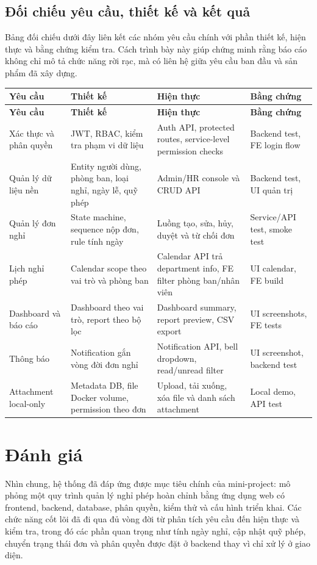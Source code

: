 \subsection{Đối chiếu yêu cầu, thiết kế và kết quả}
Bảng đối chiếu dưới đây liên kết các nhóm yêu cầu chính với phần thiết kế, hiện thực và bằng chứng kiểm tra. Cách trình bày này giúp chứng minh rằng báo cáo không chỉ mô tả chức năng rời rạc, mà có liên hệ giữa yêu cầu ban đầu và sản phẩm đã xây dựng.

\begingroup
\small
\begin{longtable}{p{}p{}p{}p{}}
\toprule
\textbf{Yêu cầu} & \textbf{Thiết kế} & \textbf{Hiện thực} & \textbf{Bằng chứng} \\
\midrule
\endfirsthead
\toprule
\textbf{Yêu cầu} & \textbf{Thiết kế} & \textbf{Hiện thực} & \textbf{Bằng chứng} \\
\midrule
\endhead
Xác thực và phân quyền & JWT, RBAC, kiểm tra phạm vi dữ liệu & Auth API, protected routes, service-level permission checks & Backend test, FE login flow \\
Quản lý dữ liệu nền & Entity người dùng, phòng ban, loại nghỉ, ngày lễ, quỹ phép & Admin/HR console và CRUD API & Backend test, UI quản trị \\
Quản lý đơn nghỉ & State machine, sequence nộp đơn, rule tính ngày & Luồng tạo, sửa, hủy, duyệt và từ chối đơn & Service/API test, smoke test \\
Lịch nghỉ phép & Calendar scope theo vai trò và phòng ban & Calendar API trả department info, FE filter phòng ban/nhân viên & UI calendar, FE build \\
Dashboard và báo cáo & Dashboard theo vai trò, report theo bộ lọc & Dashboard summary, report preview, CSV export & UI screenshots, FE tests \\
Thông báo & Notification gắn vòng đời đơn nghỉ & Notification API, bell dropdown, read/unread filter & UI screenshot, backend test \\
Attachment local-only & Metadata DB, file Docker volume, permission theo đơn & Upload, tải xuống, xóa file và danh sách attachment & Local demo, API test \\
\bottomrule
\end{longtable}
\endgroup

\section{Đánh giá}
Nhìn chung, hệ thống đã đáp ứng được mục tiêu chính của mini-project: mô phỏng một quy trình quản lý nghỉ phép hoàn chỉnh bằng ứng dụng web có frontend, backend, database, phân quyền, kiểm thử và cấu hình triển khai. Các chức năng cốt lõi đã đi qua đủ vòng đời từ phân tích yêu cầu đến hiện thực và kiểm tra, trong đó các phần quan trọng như tính ngày nghỉ, cập nhật quỹ phép, chuyển trạng thái đơn và phân quyền được đặt ở backend thay vì chỉ xử lý ở giao diện.

